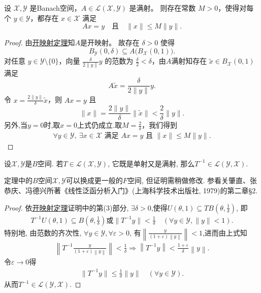 \documentclass[../../main.tex]{subfiles}%
\begin{document}
\begin{corollary}[开映射定理的推论]\label{corollary:开映射--有界原像}
设 $\mathscr{X},\mathscr{Y}$ 是Banach空间，$A\in\mathscr{L}(\mathscr{X},\mathscr{Y})$ 是满射。
则存在常数 $M>0$，使得对每个 $y\in\mathscr{Y}$，都存在 $x\in\mathscr{X}$ 满足
\[
Ax = y \quad\text{且}\quad \|x\| \leqslant M\|y\|.
\]
\end{corollary}
\begin{proof}
由\hyperref[theorem:泛函分析--开映射定理]{开映射定理}知$A$是开映射。
故存在 $\delta>0$ 使得
\[
B_{\mathscr{Y}}(0,\delta)\subseteq A\bigl(B_{\mathscr{X}}(0,1)\bigr).
\]
对任意 $y\in\mathscr{Y}\setminus\{0\}$，向量 $\frac{\delta}{2\|y\|}y$ 的范数为 $\frac{\delta}{2}<\delta$，由$A$满射知存在 $\tilde{x}\in B_{\mathscr{X}}(0,1)$ 满足
\[
A\tilde{x}=\frac{\delta}{2\|y\|}y.
\]
令 $x=\frac{2\|y\|}{\delta}\tilde{x}$，则 $Ax=y$ 且
\[
\|x\|=\frac{2\|y\|}{\delta}\|\tilde{x}\|<\frac{2}{\delta}\|y\|.
\]
另外,当$y=0$时,取$x=0$上式仍成立.取$M=\frac{2}{\delta}$，我们得到
\begin{align*}
\forall y\in\mathscr{Y},\ \exists x\in\mathscr{X}\text{ 满足 } Ax=y \text{ 且 } \|x\|\leqslant M\|y\|.
\end{align*}
\end{proof}

\begin{theorem}[Banach逆算子定理]\label{theorem:泛函分析--Banach逆算子定理}
设$\mathscr{X},\mathscr{Y}$是$B$空间. 若$T\in\mathscr{L}(\mathscr{X},\mathscr{Y})$, 它既是单射又是满射, 那么$T^{-1}\in\mathscr{L}(\mathscr{Y},\mathscr{X})$.
\end{theorem}
\begin{remark}
定理中的$B$空间$\mathscr{X},\mathscr{Y}$可以换成更一般的$F$空间, 但证明需稍做修改. 参看关肇直、张恭庆、冯德兴所著《线性泛函分析入门》(上海科学技术出版社, 1979)的第二章§2.
\end{remark}
\begin{proof}
依\hyperref[theorem:泛函分析--开映射定理]{开映射定理}证明中的第(3)部分, $\exists \delta>0$,使得$U(\theta,1)\subseteq TB\left(\theta,\frac{1}{\delta}\right)$, 即
\begin{align*}
T^{-1}U(\theta ,1)\subseteq B\left( \theta ,\frac{1}{\delta} \right) \text{或}\parallel T^{-1}y\parallel <\frac{1}{\delta}\quad (\forall y\in \mathscr{Y} ,\parallel y\parallel <1).
\end{align*}
特别地, 由范数的齐次性, $\forall y\in\mathscr{Y},\forall\varepsilon>0$, 有$\left\| \frac{y}{\left( 1+\varepsilon \right) \left\| y \right\|} \right\| <1$,进而由上式知
\begin{align*}
\left\| T^{-1}\frac{y}{\left( 1+\varepsilon \right) \left\| y \right\|} \right\| <\frac{1}{\delta}\Longrightarrow \left\| T^{-1}y \right\| <\frac{1+\varepsilon}{\delta}\left\| y \right\| .
\end{align*}
令$\varepsilon\to0$得
\begin{align*}
\|T^{-1}y\|\leqslant\frac{1}{\delta}\|y\|\quad(\forall y\in\mathscr{Y}).
\end{align*}
从而$T^{-1}\in\mathscr{L}(\mathscr{Y},\mathscr{X})$.
\end{proof}
\end{document}
